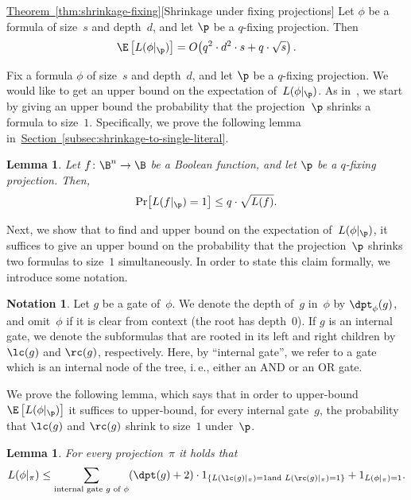\documentclass[11pt]{article}
\numberwithin{equation}{section}
\newtheorem{lemma}[theorem]{Lemma}
\theoremstyle{definition}
\theoremstyle{plain}
\newcommand{\ie}{i.\,e.}
\newcommand{\expref}[2]{\hyperref[#2]{#1~\ref{#2}}}
\theoremstyle{definition}\newtheorem{notation}[theorem]{Notation}\theoremstyle{plain}
\begin{document}
\begin{restated}{\expref{Theorem}{thm:shrinkage-fixing}}[Shrinkage under fixing projections]
Let $\phi$ be a formula of size~$s$ and depth~$d$, and let
$\p$ be a $q$-fixing projection. Then 
\[
\E\left[L(\phi|_{\p})\right]=O\!\left(q^{2}\cdot d^{2}\cdot s+q\cdot\sqrt{s}\right).
\]
\end{restated}

Fix a formula $\phi$ of size~$s$ and depth~$d$, and let $\p$
be a $q$-fixing projection. We would like to
%
get an upper bound on  %
the expectation
of~$L(\phi|_{\p})$. As in~\cite{H98}, we start by 
%
giving an upper bound %
the probability that the projection~$\p$ shrinks a formula to size~$1$.
Specifically, we prove the following lemma in~\expref{Section}{subsec:shrinkage-to-single-literal}. 
\begin{lemma}
\label{lemma:shrinkage-to-single-literal}Let $f\colon\B^{n}\to\B$ be a
Boolean function, and let $\p$ be a $q$-fixing projection. Then,
\[
\Pr\!\left[L(f|_{\p})=1\right]\le q\cdot\sqrt{L(f)}.
\]
\end{lemma}

Next, we show that to %
find and upper bound on %
the expectation of~$L(\phi|_{\p})$,
it suffices to %
give an upper bound on %
the probability that the projection~$\p$
shrinks two formulas to size~$1$ simultaneously. In order to state
this claim formally, we introduce some notation. 
\begin{notation}
Let $g$ be a gate of~$\phi$. We denote the depth of~$g$ in~$\phi$
by $\dpt_{\phi}(g)$, and omit~$\phi$ if it is clear from context
(the root has depth~$0$). If $g$ is an internal gate, we denote
the %
subformulas  %
that are rooted in its left and right children by
$\lc(g)$ and $\rc(g)$, respectively. Here, by ``internal gate'',
we refer to a gate which is an internal node of the tree, \ie, either
an AND or an OR gate.
\end{notation}

We prove the following lemma, which says that in order to upper-bound
$\E\left[L(\phi|_{\p})\right]$ it suffices to upper-bound, for every
internal gate~$g$, the probability that $\lc(g)$ and $\rc(g)$
shrink to size~$1$ under~$\p$. 
\begin{lemma}
\label{lemma:reduction-to-size-2}For every projection~$\pi$ it holds
that   %
\[
L(\phi|_{\pi})\le\sum_{\text{\rm internal gate \ensuremath{g} of \ensuremath{\phi}}}(\dpt(g)+2)\cdot1_{\left\{ L(\lc(g)|_{\pi})=1\text{\rm  and }L(\rc(g)|_{\pi})=1\right\} }+1_{L(\phi|_{\pi})=1}.
\]
\end{lemma}
\end{document}
